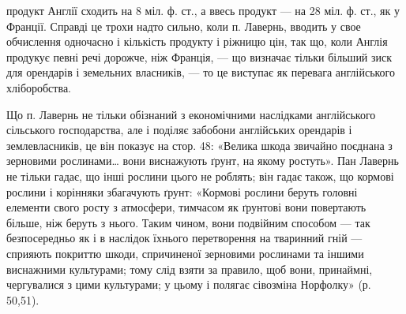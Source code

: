 \parcont{}  %
продукт Англії сходить на 8 міл. ф. ст., а ввесь продукт — на 28 міл. ф. ст.,
як у Франції. Справді це трохи надто сильно, коли п. Лавернь, вводить у свое
обчислення одночасно і кількість продукту і ріжницю цін, так що, коли Англія
продукує певні речі дорожче, ніж Франція, — що визначає тільки більший зиск
для орендарів і земельних власників, — то це виступає як перевага англійського
хліборобства.

Що п. Лавернь не тільки обізнаний з економічними наслідками англійського
сільського господарства, але і поділяє забобони англійських орендарів
і землевласників, це він показує на стор. 48: «Велика шкода звичайно поєднана
з зерновими рослинами\dots{} вони виснажують ґрунт, на якому ростуть».
Пан Лавернь не тільки гадає, що інші рослини цього не роблять; він гадає також,
що кормові рослини і корінняки збагачують ґрунт: «Кормові рослини беруть
головні елементи свого росту з атмосфери, тимчасом як ґрунтові вони повертають
більше, ніж беруть з нього. Таким чином, вони подвійним способом — так
безпосередньо як і в наслідок їхнього перетворення на тваринний гній — сприяють
покриттю шкоди, спричиненої зерновими рослинами та іншими виснажними
культурами; тому слід взяти за правило, щоб вони, принаймні, чергувалися з цими
культурами; у цьому і полягає сівозміна Норфолку» (р. 50,51).

